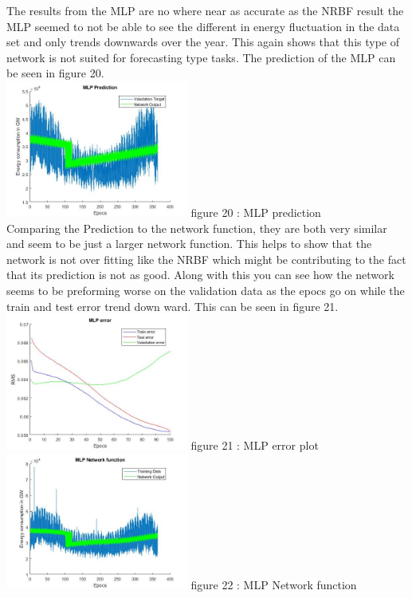 \documentclass{IEEEtran}[11pt]
\begin{document}
\begin{flushleft}
  The results from the MLP are no where near as accurate as the NRBF result
  the MLP seemed to not be able to see the different in energy fluctuation
  in the data set and only trends downwards over the year. This again shows
  that this type of network is not suited for forecasting type tasks. The
  prediction of the MLP can be seen in figure 20.
  \\
  \vspace{1.5mm}
  \includegraphics[width = 0.45\textwidth]{MLPprediction.jpg}
  \vspace{1.5mm}
  {\footnotesize figure 20 : MLP prediction }
  \\
  \vspace{1.5mm}
  Comparing the Prediction to the network function, they are both very similar
  and seem to be just a larger network function. This helps to show that the
  network is not over fitting like the NRBF which might be contributing to the
  fact that its prediction is not as good. Along with this you can see how the
  network seems to be preforming worse on the validation data as the epocs go on
  while the train and test error trend down ward. This can be seen in figure 21.
  \\
  \vspace{1.5mm}
  \includegraphics[width = 0.45\textwidth]{MLPerrorPlot.jpg}
  \vspace{1.5mm}
  {\footnotesize figure 21 : MLP error plot }
  \\
  \vspace{1.5mm}
  \includegraphics[width = 0.45\textwidth]{MLPNetworkFunction.jpg}
  \vspace{1.5mm}
  {\footnotesize figure 22 : MLP Network function }
\end{flushleft}
\end{document}
